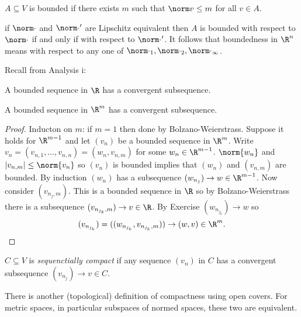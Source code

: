 \documentclass[a4paper]{article}
\theoremstyle{definition}
\begin{document}
\begin{definition}[Boundedness]
  \(A \subseteq V\) is bounded if there exists \(m\) such that \(\norm v \leq m \) for all \(v\in A\).
\end{definition}

\begin{remark}
  if \(\norm \cdot\) and \(\norm \cdot'\) are Lipschitz equivalent then \(A\) is bounded with respect to \(\norm \cdot\) if and only if with respect to \(\norm \cdot'\). It follows that boundedness in \(\R^n\) means with respect to any one of \(\norm \cdot_1, \norm \cdot_2, \norm \cdot_\infty\).
\end{remark}

Recall from Analysis i:
\begin{theorem}
  A bounded sequence in \(\R\) has a convergent subsequence.
\end{theorem}

\begin{corollary}
  A bounded sequence in \(\R^m\) has a convergent subsequence.
\end{corollary}

\begin{proof}
  Inducton on \(m\): if \(m=1\) then done by Bolzano-Weierstrass. Suppose it holds for \(\R^{m-1}\) and let \((v_n)\) be a bounded sequence in \(\R^m\). Write \(v_n = (v_{n,1},\dots,v_{n,n}) = (w_n,v_{n,m})\) for some \(w_n\in \R^{m-1}\). \(\norm{w_n}\) and \(|v_{n,m}| \leq \norm{v_n}\) so \((v_n)\) is bounded implies that \((w_n)\) and \((v_{n,m})\) are bounded. By induction \((w_n)\) has a subsequence \((w_{n_j}) \to w \in \R^{m-1}\). Now consider \((v_{n_j,m})\). This is a bounded sequence in \(\R\) so by Bolzano-Weierstrass there is a subsequence \((v_{n_{j_k},m}) \to v \in\R\). By Exercise \((w_{n_{j_k}}) \to w\) so
  \[
    (v_{n_{j_k}}) = ((w_{n_{j_k}},v_{n_{j_k},m})) \to (w, v) \in \R^m.
  \]
\end{proof}

\begin{definition}
  \(C \subseteq V\) is \emph{sequenctially compact} if any sequence \((v_n)\) in \(C\) has a convergent subsequence \((v_{n_j}) \to v \in C\).
\end{definition}

\begin{remark}
  There is another (topological) definition of compactness using open covers. For metric spaces, in particular subspaces of normed spaces, these two are equivalent.
\end{remark}
\end{document}
